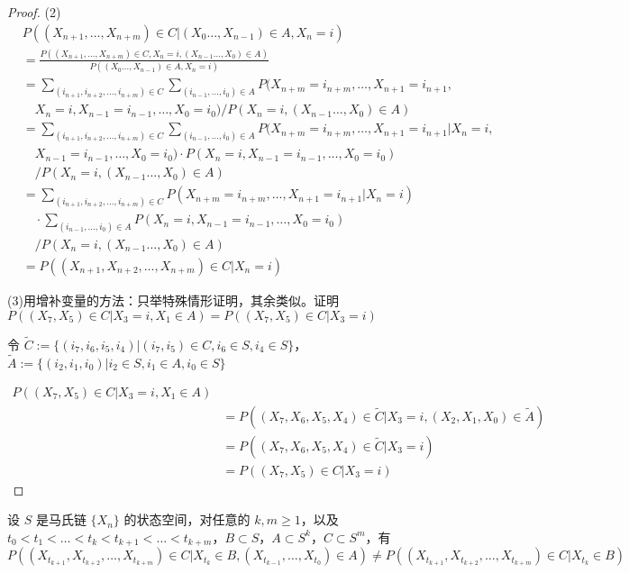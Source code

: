 \documentclass[lang=cn,10pt,thmcnt=section]{elegantbook}
\begin{document}
\begin{proof}
	(2)\[
\begin{aligned}
& P((X_{n+1}, \ldots, X_{n+m}) \in C | (X_0 \ldots, X_{n-1}) \in A, X_n = i) \\
& = \frac{P((X_{n+1}, \ldots, X_{n+m}) \in C, X_n = i, (X_{n-1} \ldots, X_0) \in A)}{P((X_0 \ldots, X_{n-1}) \in A, X_n = i)} \\
& = \sum_{(i_{n+1}, i_{n+2}, \ldots, i_{n+m}) \in C} \sum_{(i_{n-1}, \ldots, i_0) \in A} P(X_{n+m} = i_{n+m}, \ldots, X_{n+1} = i_{n+1}, \\
& \quad X_n = i, X_{n-1} = i_{n-1}, \ldots, X_0 = i_0) / P(X_n = i, (X_{n-1} \ldots, X_0) \in A) \\
& = \sum_{(i_{n+1}, i_{n+2}, \ldots, i_{n+m}) \in C} \sum_{(i_{n-1}, \ldots, i_0) \in A} P(X_{n+m} = i_{n+m}, \ldots, X_{n+1} = i_{n+1} | X_n = i, \\
& \quad X_{n-1} = i_{n-1}, \ldots, X_0 = i_0) \cdot P(X_n = i, X_{n-1} = i_{n-1}, \ldots, X_0 = i_0) \\
& \quad / P(X_n = i, (X_{n-1} \ldots, X_0) \in A) \\
& = \sum_{(i_{n+1}, i_{n+2}, \ldots, i_{n+m}) \in C} P(X_{n+m} = i_{n+m}, \ldots, X_{n+1} = i_{n+1} | X_n = i) \\
& \quad \cdot \sum_{(i_{n-1}, \ldots, i_0) \in A} P(X_n = i, X_{n-1} = i_{n-1}, \ldots, X_0 = i_0) \\
& \quad / P(X_n = i, (X_{n-1} \ldots, X_0) \in A) \\
& = P((X_{n+1}, X_{n+2}, \ldots, X_{n+m}) \in C | X_n = i)
\end{aligned}
\]

(3)用增补变量的方法：只举特殊情形证明，其余类似。证明 \(P((X_7, X_5) \in C | X_3 = i, X_1 \in A) = P((X_7, X_5) \in C | X_3 = i)\)

令 \(\tilde{C} := \{(i_7, i_6, i_5, i_4) | (i_7, i_5) \in C, i_6 \in S, i_4 \in S\}\)，\(\tilde{A} := \{(i_2, i_1, i_0) | i_2 \in S, i_1 \in A, i_0 \in S\}\)

\[
\begin{aligned}
P((X_7, X_5) \in C | X_3 = i, X_1 \in A) \\
& = P((X_7, X_6, X_5, X_4) \in \tilde{C} | X_3 = i, (X_2, X_1, X_0) \in \tilde{A}) \\
& = P((X_7, X_6, X_5, X_4) \in \tilde{C} | X_3 = i) \\
& = P((X_7, X_5) \in C | X_3 = i)
\end{aligned}
\]
\end{proof}
\begin{remark}
	设 $S$ 是马氏链 $\{X_n\}$ 的状态空间，对任意的 $k, m \geq 1$，以及 $t_0 < t_1 < \ldots < t_k < t_{k+1} < \ldots < t_{k+m}$，$B \subset S$，$A \subset S^k$，$C \subset S^m$，有
\[
P((X_{t_{k+1}}, X_{t_{k+2}}, \ldots, X_{t_{k+m}}) \in C | X_{t_k} \in B, (X_{t_{k-1}}, \ldots, X_{t_0}) \in A) \neq P((X_{t_{k+1}}, X_{t_{k+2}}, \ldots, X_{t_{k+m}}) \in C | X_{t_k} \in B)
\]
\end{remark}
\end{document}
